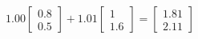 \documentclass[preview]{standalone}
\begin{document}
\begin{align*}
1.00 \begin{bmatrix} 0.8 \\ 0.5 \end{bmatrix} + 1.01 \begin{bmatrix} 1 \\ 1.6 \end{bmatrix} = \begin{bmatrix} 1.81 \\ 2.11 \end{bmatrix}
\end{align*}
\end{document}
